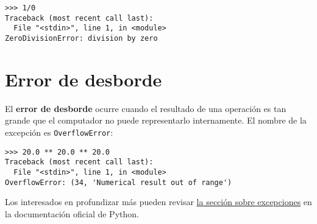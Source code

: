 \begin{lstlisting}[language={}]
>>> 1/0
Traceback (most recent call last):
  File "<stdin>", line 1, in <module>
ZeroDivisionError: division by zero
\end{lstlisting}

\section{Error de desborde}

El \textbf{error de desborde} ocurre cuando el resultado de una
operación es tan grande que el computador no puede representarlo
internamente.
El nombre de la excepción es \lstinline!OverflowError!:

\begin{lstlisting}[language={}]
>>> 20.0 ** 20.0 ** 20.0
Traceback (most recent call last):
  File "<stdin>", line 1, in <module>
OverflowError: (34, 'Numerical result out of range')
\end{lstlisting}

Los interesados en profundizar más pueden revisar
\href{http://docs.python.org/library/exceptions.html}{la sección sobre
excepciones} en la documentación oficial de Python.
